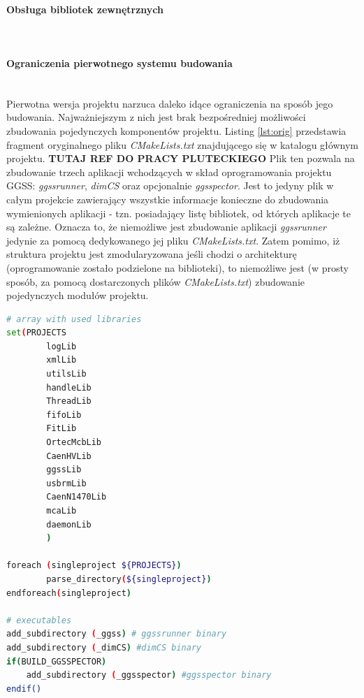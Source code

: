 \paragraph*{Obsługa bibliotek zewnętrznych}\mbox{}\\



\paragraph*{Ograniczenia pierwotnego systemu budowania}\mbox{}\\
Pierwotna wersja projektu narzuca daleko idące ograniczenia na sposób jego budowania. Najważniejszym z nich jest brak bezpośredniej możliwości zbudowania pojedynczych komponentów projektu. Listing \ref{lst:orig} przedstawia fragment oryginalnego pliku \textit{CMakeLists.txt} znajdującego się w katalogu głównym projektu. \textbf{TUTAJ REF DO PRACY PLUTECKIEGO} Plik ten pozwala na zbudowanie trzech aplikacji wchodzących w skład oprogramowania projektu GGSS: \textit{ggssrunner}, \textit{dimCS} oraz opcjonalnie \textit{ggsspector}. Jest to jedyny plik w całym projekcie zawierający wszystkie informacje konieczne do zbudowania wymienionych aplikacji - tzn. posiadający listę bibliotek, od których aplikacje te są zależne. Oznacza to, że niemożliwe jest zbudowanie aplikacji \textit{ggssrunner} jedynie za pomocą dedykowanego jej pliku \textit{CMakeLists.txt}. Zatem pomimo, iż struktura projektu jest zmodularyzowana jeśli chodzi o architekturę (oprogramowanie zostało podzielone na biblioteki), to niemożliwe jest (w prosty sposób, za pomocą dostarczonych plików \textit{CMakeLists.txt}) zbudowanie pojedynczych modułów projektu.

\begin{lstlisting}[language=bash, caption={Fragment oryginalnego pliku CMakeLists.txt znajdującego się w katalogu głównym pierwotnej wersji projektu}, label={lst:orig}]
# array with used libraries
set(PROJECTS
        logLib
        xmlLib
        utilsLib
        handleLib
        ThreadLib
        fifoLib
        FitLib
        OrtecMcbLib
        CaenHVLib
        ggssLib
        usbrmLib
        CaenN1470Lib
        mcaLib
        daemonLib
        )

foreach (singleproject ${PROJECTS})
        parse_directory(${singleproject})
endforeach(singleproject)

# executables
add_subdirectory (_ggss) # ggssrunner binary
add_subdirectory (_dimCS) #dimCS binary
if(BUILD_GGSSPECTOR)
    add_subdirectory (_ggsspector) #ggsspector binary
endif()
\end{lstlisting}

